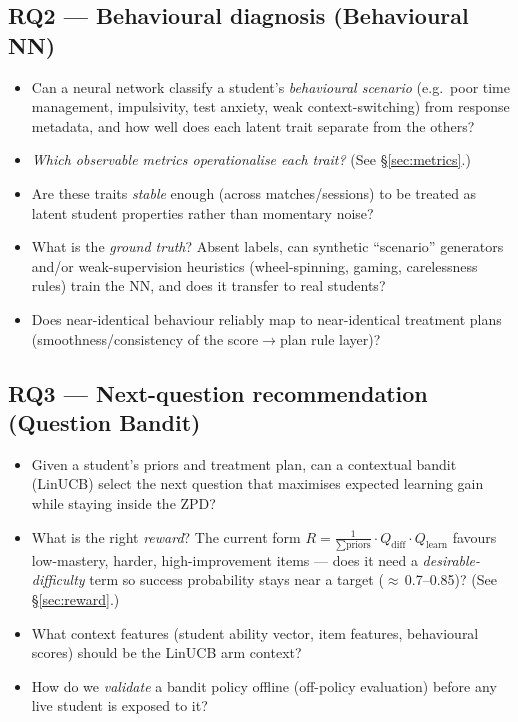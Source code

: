 \documentclass[11pt]{article}
\begin{document}
\subsection{RQ2 --- Behavioural diagnosis (Behavioural NN)}
\begin{itemize}
\item[\textbf{RQ2}] Can a neural network classify a student's \emph{behavioural scenario} (e.g.\ poor time management, impulsivity, test anxiety, weak context-switching) from response metadata, and how well does each latent trait separate from the others?
\item[RQ2.1] \emph{Which observable metrics operationalise each trait?} (See \S\ref{sec:metrics}.)
\item[RQ2.2] Are these traits \emph{stable} enough (across matches/sessions) to be treated as latent student properties rather than momentary noise?
\item[RQ2.3] What is the \emph{ground truth}? Absent labels, can synthetic ``scenario'' generators and/or weak-supervision heuristics (wheel-spinning, gaming, carelessness rules) train the NN, and does it transfer to real students?
\item[RQ2.4] Does near-identical behaviour reliably map to near-identical treatment plans (smoothness/consistency of the score$\rightarrow$plan rule layer)?
\end{itemize}

\subsection{RQ3 --- Next-question recommendation (Question Bandit)}
\begin{itemize}
\item[\textbf{RQ3}] Given a student's priors and treatment plan, can a contextual bandit (LinUCB) select the next question that maximises expected learning gain while staying inside the ZPD?
\item[RQ3.1] What is the right \emph{reward}? The current form $R=\tfrac{1}{\sum \text{priors}}\cdot Q_{\text{diff}}\cdot Q_{\text{learn}}$ favours low-mastery, harder, high-improvement items --- does it need a \emph{desirable-difficulty} term so success probability stays near a target ($\approx$\,0.7--0.85)? (See \S\ref{sec:reward}.)
\item[RQ3.2] What context features (student ability vector, item features, behavioural scores) should be the LinUCB arm context?
\item[RQ3.3] How do we \emph{validate} a bandit policy offline (off-policy evaluation) before any live student is exposed to it?
\end{itemize}
\end{document}
